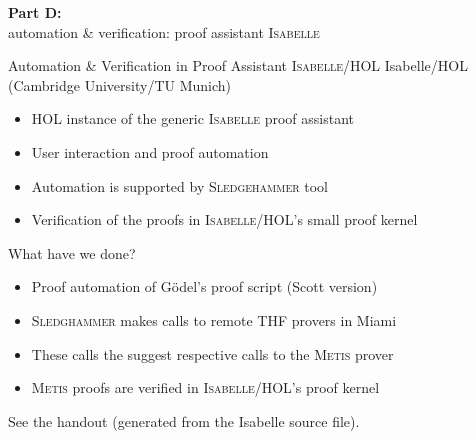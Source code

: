 
\begin{transitionframe}{} \Large \centering
\textbf{Part D:} \\
\quad automation \& verification: proof assistant \textsc{Isabelle} \\[2em]
\end{transitionframe}



\begin{frame}{Automation \& Verification in Proof Assistant \textsc{Isabelle/HOL}} \Large
Isabelle/HOL   (Cambridge University/TU Munich)
\begin{itemize}
\item HOL instance of the generic \textsc{Isabelle} proof assistant
\item User interaction and proof automation 
\item Automation is supported by \textsc{Sledgehammer} tool
\item Verification of the proofs in \textsc{Isabelle/HOL}'s small proof kernel
\end{itemize}
\vfill
What have we done?
\begin{itemize}
\item Proof automation of G\"odel's proof script (Scott version)
\item \textsc{Sledghammer} makes calls to remote THF provers in Miami
\item These calls the suggest respective calls to the \textsc{Metis} prover
\item \textsc{Metis} proofs are verified in \textsc{Isabelle/HOL}'s proof kernel
\end{itemize}
\vfill
See the handout (generated from the Isabelle source file).
\end{frame}